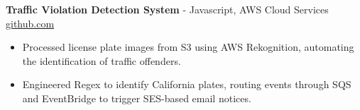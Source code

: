 \documentclass[11pt]{article}       %
\begin{document}

\textbf{Traffic Violation Detection System}{ - Javascript, AWS Cloud Services} \hfill \href{https://github.com/Monica20030707/AWS_rekonigition-N-read-database}{github.com} \\
\vspace{-9pt}
\begin{itemize}
  \item Processed license plate images from S3 using AWS Rekognition, automating the identification of traffic offenders.
  \item Engineered Regex to identify California plates, routing events through SQS and EventBridge to trigger SES-based email notices.
\end{itemize}

\end{document}

